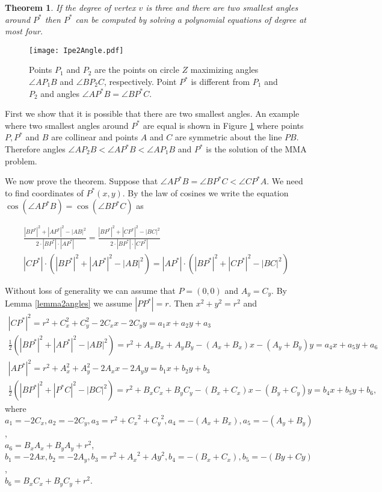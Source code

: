\documentclass[10pt]{article}
\newtheorem{thm}[theorem]{Theorem}
\newenvironment{proof}{\begingroup\Proof}{\qed\endgroup}
\def\Proof{\noindent{\bf Proof\/:}\nobreak}
\def\qed{\unskip~{\vrule height 4pt depth 0pt width 4pt}\medbreak}
\begin{document}
\begin{thm} \label{thm2angles}
If the degree of vertex $v$ is three and there are two smallest angles around $P^*$ then $P^*$ can be computed by solving a polynomial equations of degree at most four.
\end{thm}


\begin{figure}[htp]
\centering
\texttt{[image: Ipe2Angle.pdf]}
\caption{
Points $P_1$ and $P_2$ are the points on circle $Z$ maximizing angles $\angle AP_1B$ and $\angle BP_2C$, respectively. Point $P^*$ is different from $P_1$ and $P_2$ and angles $\angle AP^*B=\angle BP^*C$.}
\label{Ipe2Angle}
\end{figure}

\begin{proof}
First we show that it is possible that there are two smallest angles. 
An example where two smallest angles around $P^*$ are equal is shown in Figure  \ref{Ipe2Angle} where points $P,P^*$ and $B$ are collinear and 
points $A$ and $C$ are symmetric about the line $PB$.
Therefore angles $\angle AP_2B<\angle AP^*B<\angle AP_1B$ and $P^*$ is the solution of the MMA problem.

We now prove the theorem. Suppose that $\angle AP^*B=\angle BP^*C<\angle CP^*A$. 
We need to find coordinates of $P^*(x,y)$.
By the law of cosines we write the equation $\cos(\angle AP^*B)=\cos(\angle BP^*C)$ as

\begin{gather}
\frac {|BP^*|^2+|AP^*|^2-|AB|^2}{2\cdot|BP^*|\cdot|AP^*|}=\frac{|BP^*|^2+|CP^*|^2-|BC|^2}{2\cdot|BP^*|\cdot |CP^*|}\\
|CP^*|\cdot (|BP^*|^2+|AP^*|^2-|AB|^2)=|AP^*|\cdot (|BP^*|^2+|CP^*|^2-|BC|^2) \label{eq43} 
\end{gather}

Without loss of generality we can assume that $P=(0,0)$ and $A_y=C_y$. 
By Lemma \ref{lemma2angles} we assume $|PP^*|=r$. 
Then $x^2+y^2=r^2$ and
\begin{gather}
|CP^*|^2=r^2+C_x^2+C_y^2-2C_xx-2C_yy=a_1x+a_2y+a_3\\
\frac 12 (|BP^*|^2+|AP^*|^2-|AB|^2) =
r^2+A_xB_x+A_yB_y-(A_x+B_x)x-(A_y+B_y)y
=a_4x+a_5y+a_6\\
|AP^*|^2=r^2+A_x^2+A_y^2-2A_xx-2A_yy=b_1x+b_2y+b_3\\
\frac 12 (|BP^*|^2+|P^*C|^2-|BC|^2)=
r^2+B_xC_x+B_yC_y-(B_x+C_x)x-(B_y+C_y)y
=b_4x+b_5y+b_6,
\end{gather}
where $a_1=-2C_x, a_2=-2C_y, a_3=r^2+{C_x}^2+{C_y}^2,a_4=-(A_x+B_x), a_5=-(A_y+B_y)$,\\
$a_6=B_xA_x+B_yA_y+r^2$, 
$b_1=-2Ax, b_2=-2A_y, b_3=r^2+{A_x}^2+{Ay}^2, b_4=-(B_x+C_x), b_5=-(By+Cy)$,\\ $b_6=B_xC_x+B_yC_y+r^2$.


\end{proof}
\end{document}
